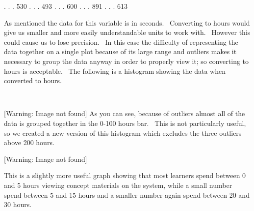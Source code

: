 \documentclass[12pt,twoside]{article}
\begin{document}
.\newline
.\newline
. {\textbar} {\textbar} {\textbar} 530\newline
.\newline
.\newline
. {\textbar} 493\newline
.\newline
.\newline
. {\textbar} 600\newline
.\newline
.\newline
. {\textbar} 891\newline
.\newline
.\newline
. {\textbar} 613


\bigskip

As mentioned the data for this variable is in seconds.~ Converting to
hours would give us smaller and more easily understandable units to
work with.~ However this could cause us to lose precision.~ In this
case the difficulty of representing the data together on a single plot
because of its large range and outliers makes it necessary to group the
data anyway in order to properly view it; so converting to hours is
acceptable.~ The following is a histogram showing the data when
converted to hours. 

~ 

 [Warning: Image not found]  
As you can see, because of outliers almost all of the data is grouped
together in the 0{}-100 hours bar.~ This is not particularly useful, so
we created a new version of this histogram which excludes the three
outliers above 200 hours. 


\bigskip

 [Warning: Image not found]  

\bigskip

This is a slightly more useful graph showing that most learners spend
between 0 and 5 hours viewing concept materials on the system, while a
small number spend between 5 and 15 hours and a smaller number again
spend between 20 and 30 hours. 
\end{document}
